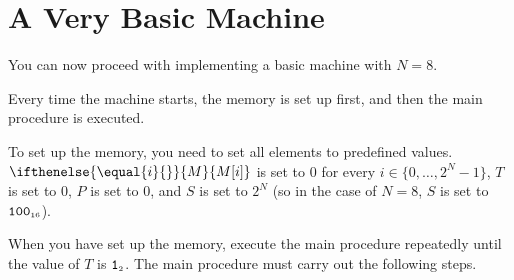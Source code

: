 \documentclass[a4paper,12pt]{article}
\newcommand{\num}[1]{\texttt{#1}}
\newcommand{\hex}[1]{\num{#1}_{\textup{\tiny 16}}}
\newcommand{\bin}[1]{\num{#1}_{\textup{\tiny 2}}}
\newcommand{\MEM}[1]{\ifthenelse{\equal{#1}{}}{M}{M[#1]}}
\newcommand{\PC}{P}
\newcommand{\SP}{S}
\newcommand{\TERM}{T}
\newcommand{\T}{\bin{1}}
\newcommand{\range}[2]{\{#1,\ldots,#2\}}
\begin{document}
\section{A Very Basic Machine}

You can now proceed with implementing a basic machine with $N=8$.

Every time the machine starts, the memory is set up first, and then the main procedure is executed.

To set up the memory, you need to set all elements to predefined values.
$\MEM{i}$ is set to 0 for every $i \in \range{0}{2^N-1}$, $\TERM$ is set to 0, $\PC$ is set to $0$, and $\SP$ is set to $2^N$ (so in the case of $N=8$, $\SP$ is set to $\hex{100}$).

When you have set up the memory, execute the main procedure repeatedly until the value of $\TERM$ is $\T$.
The main procedure must carry out the following steps.
\end{document}
